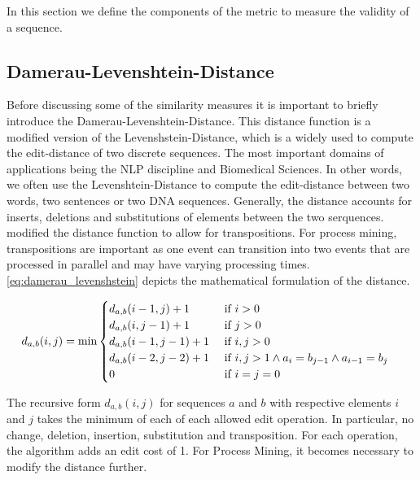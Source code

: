\documentclass[./../../paper.tex]{subfiles}
\begin{document}
In this section we define the components of the metric to measure the validity of a sequence.

\subsection{Damerau-Levenshtein-Distance}
Before discussing some of the similarity measures it is important to briefly introduce the Damerau-Levenshtein-Distance. This distance function is a modified version of the Levenshstein-Distance\autocite{levenshtein_Binarycodescapable_1965}, which is a widely used to compute the edit-distance of two discrete sequences. The most important domains of applications being the \gls{NLP} discipline and Biomedical Sciences. In other words, we often use the Levenshtein-Distance to compute the edit-distance between two words, two sentences or two DNA sequences. Generally, the distance accounts for inserts, deletions and substitutions of elements between the two serquences.
\citeauthor{damerau_techniquecomputerdetection_1964} modified the distance function to allow for transpositions. For process mining, transpositions are important as one event can transition into two events that are processed in parallel and may have varying processing times. \autoref{eq:damerau_levenshstein} depicts the mathematical formulation of the distance.   

\begin{align}
    \label{eq:damerau_levenshstein}
    d_{a, b}(i, j) & =\min
    \begin{cases}
        d_{a, b}(i-1, j  )+ 1 & \text { if } i>0                                            \\
        d_{a, b}(i  , j-1)+ 1 & \text { if } j>0                                            \\
        d_{a, b}(i-1, j-1)+ 1 & \text { if } i, j>0                                         \\
        d_{a, b}(i-2, j-2)+ 1 & \text { if } i, j>1 \land a_{i}=b_{j-1} \land a_{i-1}=b_{j} \\
        0                                 & \text { if } i=j=0                                         
    \end{cases}        
\end{align}

The recursive form $d_{a, b}(i, j)$ for sequences $a$ and $b$ with respective elements $i$ and $j$ takes the minimum of each of each allowed edit operation. In particular, no change, deletion, insertion, substitution and transposition. For each operation, the algorithm adds an edit cost of 1. For Process Mining, it becomes necessary to modify the distance further. 
\end{document}
